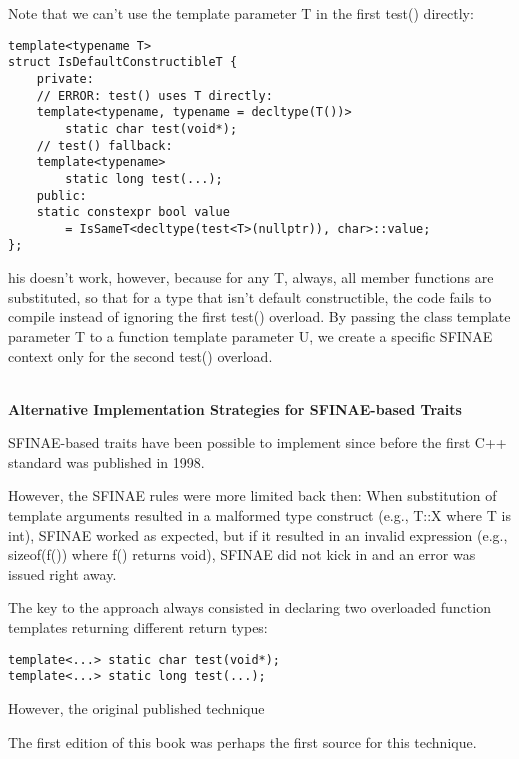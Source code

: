 Note that we can’t use the template parameter T in the first test() directly:

\begin{lstlisting}[style=styleCXX]
template<typename T>
struct IsDefaultConstructibleT {
	private:
	// ERROR: test() uses T directly:
	template<typename, typename = decltype(T())>
		static char test(void*);
	// test() fallback:
	template<typename>
		static long test(...);
	public:
	static constexpr bool value
		= IsSameT<decltype(test<T>(nullptr)), char>::value;
};
\end{lstlisting}

his doesn’t work, however, because for any T, always, all member functions are substituted, so that for a type that isn’t default constructible, the code fails to compile instead of ignoring the first test() overload. By passing the class template parameter T to a function template parameter U, we create a specific SFINAE context only for the second test() overload.

\hspace*{\fill} \\ %
\noindent
\textbf{Alternative Implementation Strategies for SFINAE-based Traits}

SFINAE-based traits have been possible to implement since before the first C++ standard was published in 1998.

\begin{tcolorbox}[colback=webgreen!5!white,colframe=webgreen!75!black]
\hspace*{0.75cm}However, the SFINAE rules were more limited back then: When substitution of template arguments resulted in a malformed type construct (e.g., T::X where T is int), SFINAE worked as expected, but if it resulted in an invalid expression (e.g., sizeof(f()) where f() returns void), SFINAE did not kick in and an error was issued right away.
\end{tcolorbox}

The key to the approach always consisted in declaring two overloaded function templates returning different return types:

\begin{lstlisting}[style=styleCXX]
template<...> static char test(void*);
template<...> static long test(...);
\end{lstlisting}

However, the original published technique

\begin{tcolorbox}[colback=webgreen!5!white,colframe=webgreen!75!black]
\hspace*{0.75cm}The first edition of this book was perhaps the first source for this technique.
\end{tcolorbox}


